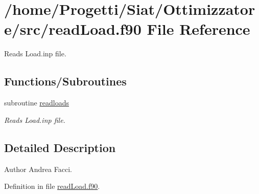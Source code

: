 \hypertarget{read_load_8f90}{\section{/home/\-Progetti/\-Siat/\-Ottimizzatore/src/read\-Load.f90 File Reference}
\label{read_load_8f90}
}


Reads Load.\-inp file.  


\subsection*{Functions/\-Subroutines}
\begin{DoxyCompactItemize}
\item 
subroutine \hyperlink{read_load_8f90_a7cfc2afc3abd098872413af5bb794e4c}{readloads}
\begin{DoxyCompactList}\small\item\em Reads Load.\-inp file. \end{DoxyCompactList}\end{DoxyCompactItemize}


\subsection{Detailed Description}
\begin{DoxyAuthor}{Author}
Andrea Facci. 
\end{DoxyAuthor}


Definition in file \hyperlink{read_load_8f90_source}{read\-Load.\-f90}.




